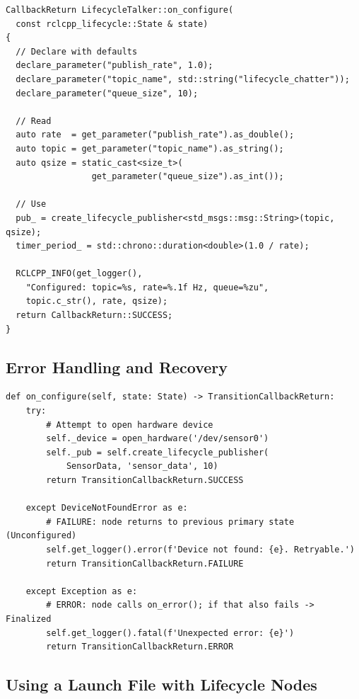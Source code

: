 \documentclass[12pt,a4paper]{article}
\begin{document}
\begin{lstlisting}[style=cpp,caption={Declaring parameters in on\_configure (C++)}]
CallbackReturn LifecycleTalker::on_configure(
  const rclcpp_lifecycle::State & state)
{
  // Declare with defaults
  declare_parameter("publish_rate", 1.0);
  declare_parameter("topic_name", std::string("lifecycle_chatter"));
  declare_parameter("queue_size", 10);

  // Read
  auto rate  = get_parameter("publish_rate").as_double();
  auto topic = get_parameter("topic_name").as_string();
  auto qsize = static_cast<size_t>(
                 get_parameter("queue_size").as_int());

  // Use
  pub_ = create_lifecycle_publisher<std_msgs::msg::String>(topic, qsize);
  timer_period_ = std::chrono::duration<double>(1.0 / rate);

  RCLCPP_INFO(get_logger(),
    "Configured: topic=%s, rate=%.1f Hz, queue=%zu",
    topic.c_str(), rate, qsize);
  return CallbackReturn::SUCCESS;
}
\end{lstlisting}

\subsection{Error Handling and Recovery}

\begin{lstlisting}[style=python,caption={Returning FAILURE vs ERROR (Python)}]
def on_configure(self, state: State) -> TransitionCallbackReturn:
    try:
        # Attempt to open hardware device
        self._device = open_hardware('/dev/sensor0')
        self._pub = self.create_lifecycle_publisher(
            SensorData, 'sensor_data', 10)
        return TransitionCallbackReturn.SUCCESS

    except DeviceNotFoundError as e:
        # FAILURE: node returns to previous primary state (Unconfigured)
        self.get_logger().error(f'Device not found: {e}. Retryable.')
        return TransitionCallbackReturn.FAILURE

    except Exception as e:
        # ERROR: node calls on_error(); if that also fails -> Finalized
        self.get_logger().fatal(f'Unexpected error: {e}')
        return TransitionCallbackReturn.ERROR
\end{lstlisting}

\subsection{Using a Launch File with Lifecycle Nodes}
\end{document}
